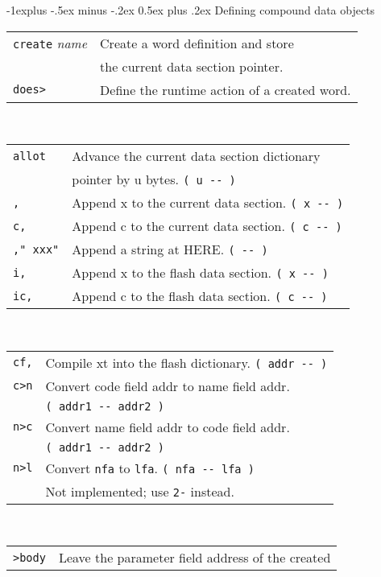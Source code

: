 \documentclass[10pt,landscape,a4paper]{article}
\makeatletter
\renewcommand{\subsection}{\@startsection{subsection}{2}{0mm}%
                                {-1explus -.5ex minus -.2ex}%
                                {0.5ex plus .2ex}%
                                {\normalfont\normalsize\bfseries}}
\newcommand{\compileonly}{\color{blue}}
\makeatother
\begin{document}
\begin{multicols}{3}
\subsection{Defining compound data objects}
\begin{tabular}{@{}ll@{}}
\verb!create! \textit{name} & Create a word definition and store \\
                            & the current data section pointer. \\
{\compileonly\verb!does>!}  & Define the runtime action of a created word. \\
\end{tabular} \\
\begin{tabular}{@{}ll@{}}
\verb!allot!  & Advance the current data section dictionary \\
              & pointer by u bytes. \verb!( u -- )! \\
\verb!,!  & Append x to the current data section. \verb!( x -- )! \\
\verb!c,!  & Append c to the current data section. \verb!( c -- )! \\
\verb!," xxx"!  & Append a string at HERE. \verb!( -- )! \\
\verb!i,!  & Append x to the flash data section. \verb!( x -- )! \\
\verb!ic,! & Append c to the flash data section. \verb!( c -- )! \\
\end{tabular} \\
\begin{tabular}{@{}ll@{}}
\verb!cf,!  & Compile xt into the flash dictionary. \verb!( addr -- )! \\
\verb!c>n!  & Convert code field addr to name field addr. \\
            & \verb!( addr1 -- addr2 )! \\
\verb!n>c!  & Convert name field addr to code field addr. \\
            & \verb!( addr1 -- addr2 )! \\
\verb!n>l!  & Convert \verb!nfa! to \verb!lfa!. \verb!( nfa -- lfa )! \\
            & Not implemented; use \verb!2-! instead. \\
\end{tabular} \\
\begin{tabular}{@{}ll@{}}
\verb!>body! & Leave the parameter field address of the created \\

\end{tabular}
\end{multicols}
\end{document}
